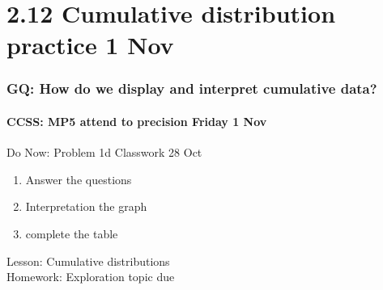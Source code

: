 \documentclass{beamer}
\begin{document}
\section{2.12 Cumulative distribution practice 1 Nov}
\frame
{
  \frametitle{GQ: How do we display and interpret cumulative data?}
  \framesubtitle{CCSS: MP5 attend to precision \hfill \alert{Friday 1 Nov}}

  \begin{block}{Do Now: Problem 1d Classwork 28 Oct}
  \begin{enumerate}
      \item Answer the questions 
      \item Interpretation the graph
      \item complete the table
  \end{enumerate}
  \end{block}
  Lesson: Cumulative distributions\\ \smallskip
  Homework: Exploration topic due
}
\end{document}
